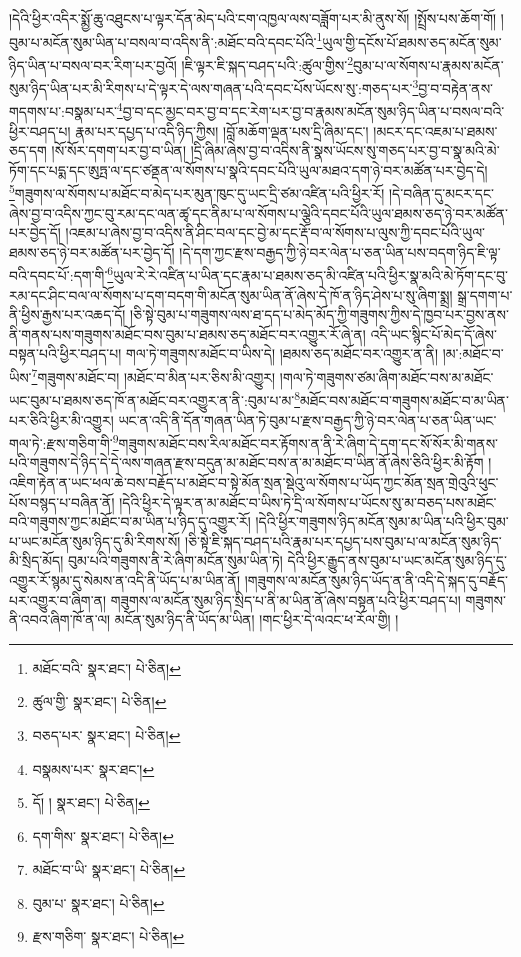 །དེའི་ཕྱིར་འདིར་སྨྱོ་ཆུ་འཐུངས་པ་ལྟར་དོན་མེད་པའི་ངག་འཁྱལ་ལས་བཟློག་པར་མི་ནུས་སོ། །སྤྲོས་པས་ཆོག་གོ། །བུམ་པ་མངོན་སུམ་ཡིན་པ་བསལ་བ་འདིས་ནི་:མཐོང་བའི་དབང་པོའི་\footnote{མཐོང་བའི་  སྣར་ཐང་།  པེ་ཅིན། }ཡུལ་གྱི་དངོས་པོ་ཐམས་ཅད་མངོན་སུམ་ཉིད་ཡིན་པ་བསལ་བར་རིག་པར་བྱའོ། །ཇི་ལྟར་ཇི་སྐད་བཤད་པའི་:ཚུལ་གྱིས་\footnote{ཚུལ་གྱི་  སྣར་ཐང་།  པེ་ཅིན། }བུམ་པ་ལ་སོགས་པ་རྣམས་མངོན་སུམ་ཉིད་ཡིན་པར་མི་རིགས་པ་དེ་ལྟར་དེ་ལས་གཞན་པའི་དབང་པོས་ཡོངས་སུ་:གཅད་པར་\footnote{བཅད་པར་  སྣར་ཐང་།  པེ་ཅིན། }བྱ་བ་བརྟེན་ནས་གདགས་པ་:བསྣམ་པར་\footnote{བསྣམས་པར་  སྣར་ཐང་། }བྱ་བ་དང་མྱང་བར་བྱ་བ་དང་རེག་པར་བྱ་བ་རྣམས་མངོན་སུམ་ཉིད་ཡིན་པ་བསལ་བའི་ཕྱིར་བཤད་པ། རྣམ་པར་དཔྱད་པ་འདི་ཉིད་ཀྱིས། །བློ་མཆོག་ལྡན་པས་དྲི་ཞིམ་དང་། །མངར་དང་འཇམ་པ་ཐམས་ཅད་དག །སོ་སོར་དགག་པར་བྱ་བ་ཡིན། །དྲི་ཞིམ་ཞེས་བྱ་བ་འདིས་ནི་སྣས་ཡོངས་སུ་གཅད་པར་བྱ་བ་སྣ་མའི་མེ་ཏོག་དང་པདྨ་དང་ཨུཏྤ་ལ་དང་ཙནྡན་ལ་སོགས་པ་སྣའི་དབང་པོའི་ཡུལ་མཐའ་དག་ཉེ་བར་མཚོན་པར་བྱེད་དེ། \footnote{དོ། །   སྣར་ཐང་།  པེ་ཅིན། }གཟུགས་ལ་སོགས་པ་མཐོང་བ་མེད་པར་མུན་ཁུང་དུ་ཡང་དྲི་ཙམ་འཛིན་པའི་ཕྱིར་རོ། །དེ་བཞིན་དུ་མངར་དང་ཞེས་བྱ་བ་འདིས་ཀྱང་བུ་རམ་དང་ལན་ཚྭ་དང་ནིམ་པ་ལ་སོགས་པ་ལྕེའི་དབང་པོའི་ཡུལ་ཐམས་ཅད་ཉེ་བར་མཚོན་པར་བྱེད་དོ། །འཇམ་པ་ཞེས་བྱ་བ་འདིས་ནི་ཤིང་བལ་དང་བྱེ་མ་དང་རྡོ་བ་ལ་སོགས་པ་ལུས་ཀྱི་དབང་པོའི་ཡུལ་ཐམས་ཅད་ཉེ་བར་མཚོན་པར་བྱེད་དོ། །དེ་དག་ཀྱང་རྫས་བརྒྱད་ཀྱི་ཉེ་བར་ལེན་པ་ཅན་ཡིན་པས་བདག་ཉིད་ཇི་ལྟ་བའི་དབང་པོ་:དག་གི་\footnote{དག་གིས་  སྣར་ཐང་།  པེ་ཅིན། }ཡུལ་རེ་རེ་འཛིན་པ་ཡིན་དང་རྣམ་པ་ཐམས་ཅད་མི་འཛིན་པའི་ཕྱིར་སྣ་མའི་མེ་ཏོག་དང་བུ་རམ་དང་ཤིང་བལ་ལ་སོགས་པ་དག་བདག་གི་མངོན་སུམ་ཡིན་ནོ་ཞེས་དེ་ཁོ་ན་ཉིད་ཤེས་པ་སུ་ཞིག་སྨྲ། སྒྲ་དགག་པ་ནི་ཕྱིས་རྒྱས་པར་འཆད་དོ། །ཅི་སྟེ་བུམ་པ་གཟུགས་ལས་ཐ་དད་པ་མེད་མོད་ཀྱི་གཟུགས་ཀྱིས་དེ་ཁྱབ་པར་བྱས་ནས་ནི་གནས་པས་གཟུགས་མཐོང་བས་བུམ་པ་ཐམས་ཅད་མཐོང་བར་འགྱུར་རོ་ཞེ་ན། འདི་ཡང་སྙིང་པོ་མེད་དོ་ཞེས་བསྟན་པའི་ཕྱིར་བཤད་པ། གལ་ཏེ་གཟུགས་མཐོང་བ་ཡིས་དེ། །ཐམས་ཅད་མཐོང་བར་འགྱུར་ན་ནི། །མ་:མཐོང་བ་ཡིས་\footnote{མཐོང་བ་ཡི་  སྣར་ཐང་།  པེ་ཅིན། }གཟུགས་མཐོང་བ། །མཐོང་བ་མིན་པར་ཅིས་མི་འགྱུར། །གལ་ཏེ་གཟུགས་ཙམ་ཞིག་མཐོང་བས་མ་མཐོང་ཡང་བུམ་པ་ཐམས་ཅད་ཁོ་ན་མཐོང་བར་འགྱུར་ན་ནི་:བུམ་པ་མ་\footnote{བུམ་པ་  སྣར་ཐང་།  པེ་ཅིན། }མཐོང་བས་མཐོང་བ་གཟུགས་མཐོང་བ་མ་ཡིན་པར་ཅིའི་ཕྱིར་མི་འགྱུར། ཡང་ན་འདི་ནི་དོན་གཞན་ཡིན་ཏེ་བུམ་པ་རྫས་བརྒྱད་ཀྱི་ཉེ་བར་ལེན་པ་ཅན་ཡིན་ཡང་གལ་ཏེ་:རྫས་གཅིག་གི་\footnote{རྫས་གཅིག་  སྣར་ཐང་།  པེ་ཅིན། }གཟུགས་མཐོང་བས་རིལ་མཐོང་བར་རྟོགས་ན་ནི་རེ་ཞིག་དེ་དག་དང་སོ་སོར་མི་གནས་པའི་གཟུགས་དེ་ཉིད་དེ་དེ་ལས་གཞན་རྫས་བདུན་མ་མཐོང་བས་ན་མ་མཐོང་བ་ཡིན་ནོ་ཞེས་ཅིའི་ཕྱིར་མི་རྟོག །འཇིག་རྟེན་ན་ཡང་ཕལ་ཆེ་བས་བརྗོད་པ་མཐོང་བ་སྟེ་མོན་སྲན་སྡེའུ་ལ་སོགས་པ་ཡོད་ཀྱང་མོན་སྲན་གྲེའུའི་ཕུང་པོས་བསྙད་པ་བཞིན་ནོ། །དེའི་ཕྱིར་དེ་ལྟར་ན་མ་མཐོང་བ་ཡིས་ཏེ་དྲི་ལ་སོགས་པ་ཡོངས་སུ་མ་བཅད་པས་མཐོང་བའི་གཟུགས་ཀྱང་མཐོང་བ་མ་ཡིན་པ་ཉིད་དུ་འགྱུར་རོ། །དེའི་ཕྱིར་གཟུགས་ཉིད་མངོན་སུམ་མ་ཡིན་པའི་ཕྱིར་བུམ་པ་ཡང་མངོན་སུམ་ཉིད་དུ་མི་རིགས་སོ། །ཅི་སྟེ་ཇི་སྐད་བཤད་པའི་རྣམ་པར་དཔྱད་པས་བུམ་པ་ལ་མངོན་སུམ་ཉིད་མི་སྲིད་མོད། བུམ་པའི་གཟུགས་ནི་རེ་ཞིག་མངོན་སུམ་ཡིན་ཏེ། དེའི་ཕྱིར་རྒྱུད་ནས་བུམ་པ་ཡང་མངོན་སུམ་ཉིད་དུ་འགྱུར་རོ་སྙམ་དུ་སེམས་ན་འདི་ནི་ཡོད་པ་མ་ཡིན་ནོ། །གཟུགས་ལ་མངོན་སུམ་ཉིད་ཡོད་ན་ནི་འདི་དེ་སྐད་དུ་བརྗོད་པར་འགྱུར་བ་ཞིག་ན། གཟུགས་ལ་མངོན་སུམ་ཉིད་སྲིད་པ་ནི་མ་ཡིན་ནོ་ཞེས་བསྟན་པའི་ཕྱིར་བཤད་པ། གཟུགས་ནི་འབའ་ཞིག་ཁོ་ན་ལ། མངོན་སུམ་ཉིད་ནི་ཡོད་མ་ཡིན། །གང་ཕྱིར་དེ་ལའང་ཕ་རོལ་གྱི། །
